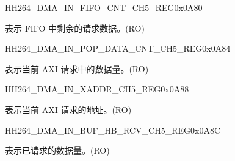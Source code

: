 \begin{register}{H}{H264\_DMA\_IN\_FIFO\_CNT\_CH5\_REG}{0x0A80}\label{regdesc:H264DMAINFIFOCNTCH5REG}
%
%
\regnewline%
\begin{regdesc}\begin{reglist}
\label{fielddesc:H264DMAINCMDFIFOINFIFOCNTCH5}\item [H264\_DMA\_IN\_CMDFIFO\_INFIFO\_CNT\_CH5] 表示 FIFO 中剩余的请求数据。(RO)
\end{reglist}\end{regdesc}
\end{register}


\begin{register}{H}{H264\_DMA\_IN\_POP\_DATA\_CNT\_CH5\_REG}{0x0A84}\label{regdesc:H264DMAINPOPDATACNTCH5REG}
%
%
\regnewline%
\begin{regdesc}\begin{reglist}
\label{fielddesc:H264DMAINCMDFIFOPOPDATACNTCH5}\item [H264\_DMA\_IN\_CMDFIFO\_POP\_DATA\_CNT\_CH5] 表示当前 AXI 请求中的数据量。(RO)
\end{reglist}\end{regdesc}
\end{register}


\begin{register}{H}{H264\_DMA\_IN\_XADDR\_CH5\_REG}{0x0A88}\label{regdesc:H264DMAINXADDRCH5REG}
%
\regnewline%
\begin{regdesc}\begin{reglist}
\label{fielddesc:H264DMAINCMDFIFOXADDRCH5}\item [H264\_DMA\_IN\_CMDFIFO\_XADDR\_CH5] 表示当前 AXI 请求的地址。(RO)
\end{reglist}\end{regdesc}
\end{register}


\begin{register}{H}{H264\_DMA\_IN\_BUF\_HB\_RCV\_CH5\_REG}{0x0A8C}\label{regdesc:H264DMAINBUFHBRCVCH5REG}
%
%
\regnewline%
\begin{regdesc}\begin{reglist}
\label{fielddesc:H264DMAINCMDFIFOBUFHBRCVCH5}\item [H264\_DMA\_IN\_CMDFIFO\_BUF\_HB\_RCV\_CH5] 表示已请求的数据量。(RO)
\end{reglist}\end{regdesc}
\end{register}




